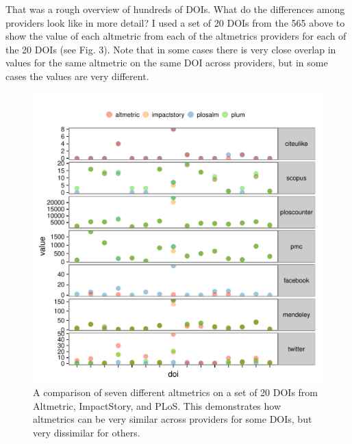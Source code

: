 \documentclass[letterpaper,superscriptaddress,showkeys,longbibliography]{revtex4-1}\usepackage{graphicx, color}
\newenvironment{knitrout}{}{} %
\begin{document}
That was a rough overview of hundreds of DOIs. What do the differences among providers look like in more detail? I used a set of 20 DOIs from the 565 above to show the value of each altmetric from each of the altmetrics providers for each of the 20 DOIs (see Fig. 3). Note that in some cases there is very close overlap in values for the same altmetric on the same DOI across providers, but in some cases the values are very different. 

\begin{knitrout}
\color{fgcolor}\begin{figure}[]


{\centering \includegraphics[width=.7\linewidth]{figure/dataconst2} 

}

\caption[A comparison of seven different altmetrics on a set of 20 DOIs from Altmetric, ImpactStory, and PLoS]{A comparison of seven different altmetrics on a set of 20 DOIs from Altmetric, ImpactStory, and PLoS. This demonstrates how altmetrics can be very similar across providers for some DOIs, but very dissimilar for others.\label{fig:dataconst2}}
\end{figure}


\end{knitrout}
\end{document}
